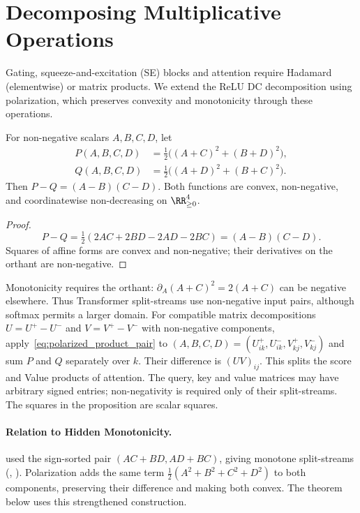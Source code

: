 \section{Decomposing Multiplicative Operations}\label{sec:multiplicative_splits}

Gating, squeeze-and-excitation (SE) blocks and attention require Hadamard (elementwise) or matrix products. We extend the ReLU DC decomposition using polarization, which preserves convexity and monotonicity through these operations.

\begin{proposition}\label{prop:convex_product_pair}
For non-negative scalars $A,B,C,D$, let
\begin{equation}
\begin{aligned}
    P(A,B,C,D)&=\tfrac12\bigl((A+C)^2+(B+D)^2\bigr),\\
    Q(A,B,C,D)&=\tfrac12\bigl((A+D)^2+(B+C)^2\bigr).
\end{aligned}
    \label{eq:polarized_product_pair}
\end{equation}
Then $P-Q=(A-B)(C-D)$. Both functions are convex, non-negative, and coordinatewise non-decreasing on $\RR^4_{\ge0}$.
\end{proposition}

\begin{proof}
\[
P-Q=\tfrac12(2AC+2BD-2AD-2BC)=(A-B)(C-D).
\]
Squares of affine forms are convex and non-negative; their derivatives on the orthant are non-negative.
\end{proof}

Monotonicity requires the orthant: $\partial_A(A+C)^2=2(A+C)$ can be negative elsewhere. Thus Transformer split-streams use non-negative input pairs, although softmax permits a larger domain. For compatible matrix decompositions $U=U^+-U^-$ and $V=V^+-V^-$ with non-negative components, apply~\eqref{eq:polarized_product_pair} to $(A,B,C,D)=(U^+_{ik},U^-_{ik},V^+_{kj},V^-_{kj})$ and sum $P$ and $Q$ separately over $k$. Their difference is $(UV)_{ij}$. This splits the score and Value products of attention. The query, key and value matrices may have arbitrary signed entries; non-negativity is required only of their split-streams. The squares in the proposition are scalar squares.

\paragraph{Relation to Hidden Monotonicity.}\label{thm:multiplicative_split}
\textcite{hiddenMono} used the sign-sorted pair $(AC+BD,AD+BC)$, giving monotone split-streams (, ). Polarization adds the same term $\tfrac12(A^2+B^2+C^2+D^2)$ to both components, preserving their difference and making both convex. The theorem below uses this strengthened construction.

